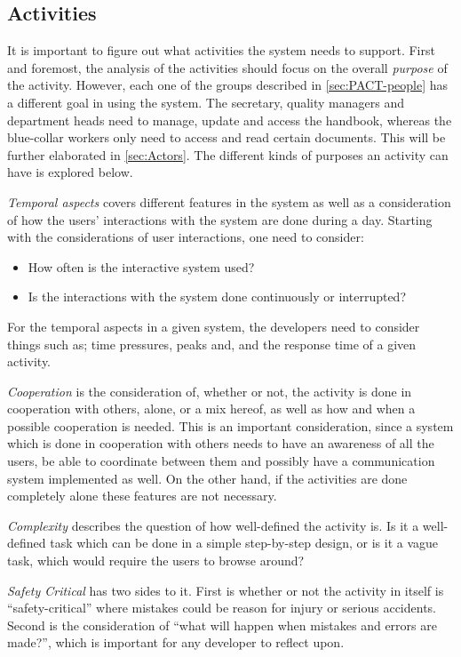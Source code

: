 \subsection{Activities}\label{sec:PACT-actvities}
It is important to figure out what activities the system needs to support.
First and foremost, the analysis of the activities should focus on the overall \textit{purpose} of the activity.
However, each one of the groups described in \cref{sec:PACT-people} has a different goal in using the system.
The secretary,  quality managers and department heads need to manage, update and access the handbook, whereas the blue-collar workers only need to access and read certain documents.
This will be further elaborated in \cref{sec:Actors}.
The different kinds of purposes an activity can have is explored below.

\textit{Temporal aspects} covers different features in the system as well as a consideration of how the users' interactions with the system are done during a day.
Starting with the considerations of user interactions, one need to consider:

\begin{itemize}
	\item How often is the interactive system used?
	\item Is the interactions with the system done continuously or interrupted?
\end{itemize}

For the temporal aspects in a given system, the developers need to consider things such as; time pressures, peaks and, and the response time of a given activity.

\textit{Cooperation} is the consideration of, whether or not, the activity is done in cooperation with others, alone, or a mix hereof, as well as how and when a possible cooperation is needed.
This is an important consideration, since a system which is done in cooperation with others needs to have an awareness of all the users, be able to coordinate between them and possibly have a communication system implemented as well.
On the other hand, if the activities are done completely alone these features are not necessary.

\textit{Complexity} describes the question of how well-defined the activity is.
Is it a well-defined task which can be done in a simple step-by-step design, or is it a vague task, which would require the users to browse around?

\textit{Safety Critical} has two sides to it.
First is whether or not the activity in itself is ``safety-critical'' where mistakes could be reason for injury or serious accidents.
Second is the consideration of ``what will happen when mistakes and errors are made?'', which is important for any developer to reflect upon.

